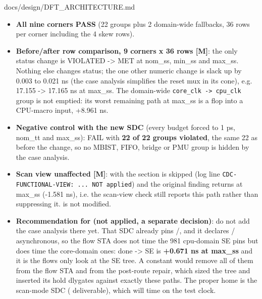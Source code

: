 \begin{relocated}{docs/design/DFT_ARCHITECTURE.md}
\begin{itemize}
\tightlist
\item
  \textbf{All nine corners PASS} (22 groups plus 2 domain-wide
  fallbacks, 36 rows per corner including the 4 skew rows).
\item
  \textbf{Before/\allowbreak{}after row comparison, 9 corners x 36 rows
  {[}M{]}}: the only status change is 
  VIOLATED -\textgreater{} MET at nom\_ss, min\_ss and max\_ss. Nothing
  else changes status; the one other numeric change is
   slack up by 0.003 to 0.021 ns (the case
  analysis simplifies the reset mux in its cone), e.g. 17.155
  -\textgreater{} 17.165 ns at max\_ss. The domain-wide
  \texttt{core\_\allowbreak{}clk\ -\allowbreak{}>\ cpu\_\allowbreak{}clk}
  group is not emptied: its worst remaining path at max\_ss is a
   flop into a CPU-macro input, +8.961 ns.
\item
  \textbf{Negative control with the new SDC} (every budget forced to 1
  ps, nom\_tt and max\_ss): FAIL with \textbf{22 of 22 groups violated},
  the same 22 as before the change, so no MBIST, FIFO, bridge or PMU
  group is hidden by the case analysis.
\item
  \textbf{Scan view unaffected {[}M{]}}: with 
  the section is skipped (log line
  \texttt{CDC-\allowbreak{}FUNCTIONAL-\allowbreak{}VIEW:\allowbreak{}\ .\allowbreak{}.\allowbreak{}.\allowbreak{}\ NOT\ applied})
  and the original finding returns at max\_ss (-1.581 ns), i.e. the
  scan-view check still reports this path rather than suppressing it.
   is not modified.
\item
  \textbf{Recommendation for  (not applied, a
  separate decision)}: do not add the  case analysis
  there yet. That SDC already pins /,
  and it declares / asynchronous, so the
  flow STA does not time the 981 cpu-domain SE pins but does time the
  core-domain ones: done -\textgreater{} SE is \textbf{+0.671 ns at
  max\_ss} and it is the flow\textquotesingle s only look at the SE
  tree. A constant  would remove all of them from the
  flow STA and from the post-route repair, which sized the tree and
  inserted its hold dlygates against exactly these paths. The proper
  home is the scan-mode SDC ( deliverable), which will time
   on the test clock.
\end{itemize}


\end{relocated}
